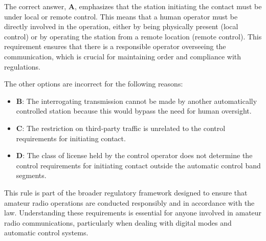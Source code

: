 The correct answer, \textbf{A}, emphasizes that the station initiating the contact must be under local or remote control. This means that a human operator must be directly involved in the operation, either by being physically present (local control) or by operating the station from a remote location (remote control). This requirement ensures that there is a responsible operator overseeing the communication, which is crucial for maintaining order and compliance with regulations.

The other options are incorrect for the following reasons:
\begin{itemize}
    \item \textbf{B}: The interrogating transmission cannot be made by another automatically controlled station because this would bypass the need for human oversight.
    \item \textbf{C}: The restriction on third-party traffic is unrelated to the control requirements for initiating contact.
    \item \textbf{D}: The class of license held by the control operator does not determine the control requirements for initiating contact outside the automatic control band segments.
\end{itemize}

This rule is part of the broader regulatory framework designed to ensure that amateur radio operations are conducted responsibly and in accordance with the law. Understanding these requirements is essential for anyone involved in amateur radio communications, particularly when dealing with digital modes and automatic control systems.

